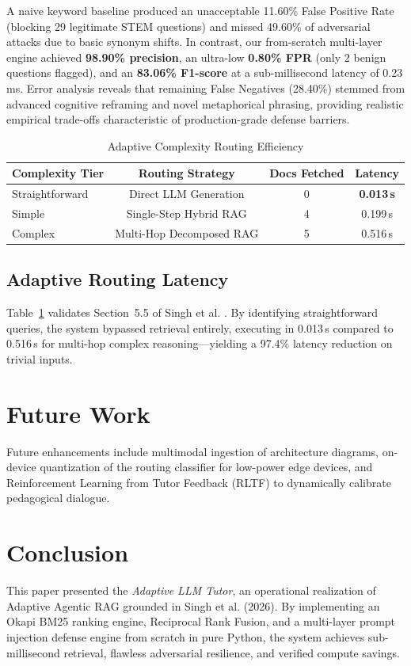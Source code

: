 \documentclass[conference]{IEEEtran}
\begin{document}
A naive keyword baseline produced an unacceptable 11.60\% False Positive Rate (blocking 29 legitimate STEM questions) and missed 49.60\% of adversarial attacks due to basic synonym shifts. In contrast, our from-scratch multi-layer engine achieved \textbf{98.90\% precision}, an ultra-low \textbf{0.80\% FPR} (only 2 benign questions flagged), and an \textbf{83.06\% F1-score} at a sub-millisecond latency of 0.23\,ms. Error analysis reveals that remaining False Negatives (28.40\%) stemmed from advanced cognitive reframing and novel metaphorical phrasing, providing realistic empirical trade-offs characteristic of production-grade defense barriers.

\begin{table}[htbp]
\caption{Adaptive Complexity Routing Efficiency}
\label{tab:routing}
\centering
\begin{tabularx}{\columnwidth}{lccc}
\toprule
\textbf{Complexity Tier} & \textbf{Routing Strategy} & \textbf{Docs Fetched} & \textbf{Latency} \\
\midrule
Straightforward & Direct LLM Generation & 0 & \textbf{0.013\,s} \\
Simple & Single-Step Hybrid RAG & 4 & 0.199\,s \\
Complex & Multi-Hop Decomposed RAG & 5 & 0.516\,s \\
\bottomrule
\end{tabularx}
\end{table}

\subsection{Adaptive Routing Latency}
Table~\ref{tab:routing} validates Section~5.5 of Singh et al. \cite{singh2026agentic}. By identifying straightforward queries, the system bypassed retrieval entirely, executing in 0.013\,s compared to 0.516\,s for multi-hop complex reasoning—yielding a 97.4\% latency reduction on trivial inputs.

\section{Future Work}
Future enhancements include multimodal ingestion of architecture diagrams, on-device quantization of the routing classifier for low-power edge devices, and Reinforcement Learning from Tutor Feedback (RLTF) to dynamically calibrate pedagogical dialogue.

\section{Conclusion}
This paper presented the \textit{Adaptive LLM Tutor}, an operational realization of Adaptive Agentic RAG grounded in Singh et al. (2026). By implementing an Okapi BM25 ranking engine, Reciprocal Rank Fusion, and a multi-layer prompt injection defense engine from scratch in pure Python, the system achieves sub-millisecond retrieval, flawless adversarial resilience, and verified compute savings.
\end{document}
